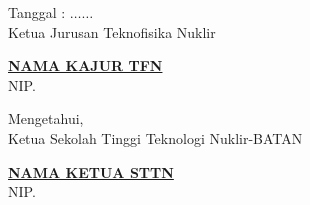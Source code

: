 \begin{center}
\begin{singlespace}
		Tanggal : $\dots\dots$\\
		Ketua Jurusan Teknofisika Nuklir \\
		
		\vspace{1.25cm}
		\begin{singlespace}\underline{\bfseries{NAMA KAJUR TFN}} \\
			NIP. 
		\end{singlespace}
		
		\vspace{0.3cm}
		Mengetahui,\\
		Ketua Sekolah Tinggi Teknologi Nuklir-BATAN\\
		
		\vspace{1.25cm}
		\begin{singlespace}
			\underline{\bfseries{NAMA KETUA STTN}} \\
			NIP. 
		\end{singlespace}
	\end{singlespace}
\end{center}